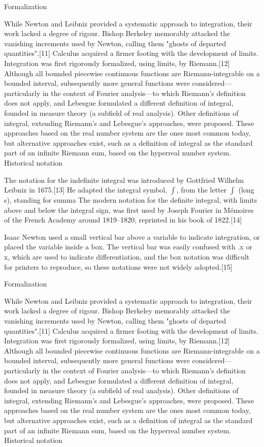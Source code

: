 \documentclass[twocolumn,a4paper,12pt]{article}
\begin{document}
Formalization

While Newton and Leibniz provided a systematic approach to integration, their work lacked a degree of rigour. Bishop Berkeley memorably attacked the vanishing increments used by Newton, calling them "ghosts of departed quantities".[11] Calculus acquired a firmer footing with the development of limits. Integration was first rigorously formalized, using limits, by Riemann.[12] Although all bounded piecewise continuous functions are Riemann-integrable on a bounded interval, subsequently more general functions were considered—particularly in the context of Fourier analysis—to which Riemann's definition does not apply, and Lebesgue formulated a different definition of integral, founded in measure theory (a subfield of real analysis). Other definitions of integral, extending Riemann's and Lebesgue's approaches, were proposed. These approaches based on the real number system are the ones most common today, but alternative approaches exist, such as a definition of integral as the standard part of an infinite Riemann sum, based on the hyperreal number system. 
Historical notation

The notation for the indefinite integral was introduced by Gottfried Wilhelm Leibniz in 1675.[13] He adapted the integral symbol, $\int$, from the letter $\int$ (long s), standing for summa  The modern notation for the definite integral, with limits above and below the integral sign, was first used by Joseph Fourier in Mémoires of the French Academy around 1819–1820, reprinted in his book of 1822.[14]

Isaac Newton used a small vertical bar above a variable to indicate integration, or placed the variable inside a box. The vertical bar was easily confused with .x or x, which are used to indicate differentiation, and the box notation was difficult for printers to reproduce, so these notations were not widely adopted.[15] 

Formalization

While Newton and Leibniz provided a systematic approach to integration, their work lacked a degree of rigour. Bishop Berkeley memorably attacked the vanishing increments used by Newton, calling them "ghosts of departed quantities".[11] Calculus acquired a firmer footing with the development of limits. Integration was first rigorously formalized, using limits, by Riemann.[12] Although all bounded piecewise continuous functions are Riemann-integrable on a bounded interval, subsequently more general functions were considered—particularly in the context of Fourier analysis—to which Riemann's definition does not apply, and Lebesgue formulated a different definition of integral, founded in measure theory (a subfield of real analysis). Other definitions of integral, extending Riemann's and Lebesgue's approaches, were proposed. These approaches based on the real number system are the ones most common today, but alternative approaches exist, such as a definition of integral as the standard part of an infinite Riemann sum, based on the hyperreal number system. 
Historical notation
\end{document}
